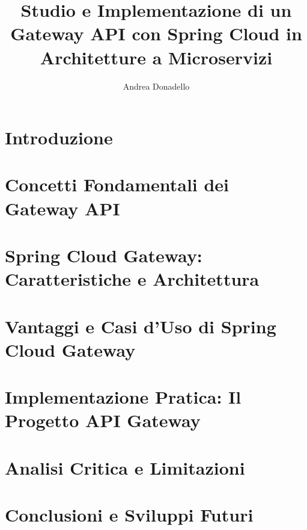 \documentclass[a4paper]{book}
\title{Studio e Implementazione di un Gateway API con Spring Cloud in Architetture a Microservizi}
\author{Andrea Donadello}
\begin{document}
    \pagestyle{plain}
    \maketitle

    

    \tableofcontents

    \listoftables 

    \lstlistoflistings

    \chapter{Introduzione}
    

    \chapter[Concetti Fondamentali]{Concetti Fondamentali dei Gateway API}
    

    \chapter[Spring Cloud Gateway]{Spring Cloud Gateway: Caratteristiche e Architettura}
    

    \chapter[Vantaggi e Casi d'Uso]{Vantaggi e Casi d'Uso di Spring Cloud Gateway}
    

    \chapter[Implementazione Pratica]{Implementazione Pratica: Il Progetto API Gateway}
    

    \chapter[Analisi e Limitazioni]{Analisi Critica e Limitazioni}
    

    \chapter{Conclusioni e Sviluppi Futuri}
    
\end{document}
